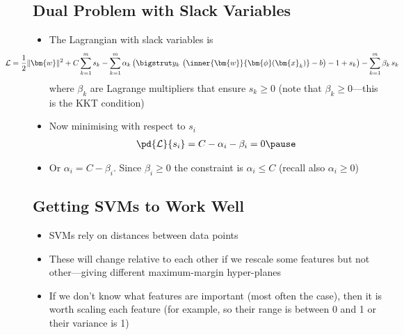 \begin{slide}
\section[-2]{Dual Problem with Slack Variables}
  
\begin{PauseHighLight}
  \begin{itemize}
  \item The Lagrangian with slack variables is { \small
    \begin{align*}
      \hspace{-2cm}\mathcal{L} = \frac{1}{2} \|\bm{w}\|^2
      + C \sum_{k=1}^m s_k
      - \sum_{k=1}^m \alpha_k \left(\bigstrut
      y_k\,\left(\strut\inner{\bm{w}}{\bm{\phi}(\bm{x}_k)} -  b\right) - 1 + s_k
      \right) - \sum_{k=1}^m \beta_k \, s_k
    \end{align*}}
    where $\beta_k$ are Lagrange multipliers that ensure $s_k\geq0$ (note
    that $\beta_k\geq0$---this is the KKT condition)\pause
  \item Now minimising with respect to $s_i$
    \begin{align*}
      \pd{\mathcal{L}}{s_i} = C - \alpha_i - \beta_i =0\pause
    \end{align*}
  \item Or $\alpha_i = C -\beta_i$.  Since $\beta_i \geq 0$ the
    constraint is $\alpha_i \leq C$\pause{} (recall also $\alpha_i\geq0$)\pauseb
  \end{itemize}
\end{PauseHighLight}

\end{slide}




\Outline %

\begin{slide}
\section[-2]{Getting SVMs to Work Well}

\pb
\begin{itemize}
\item SVMs rely on distances between data points\pauseh
\item These will change relative to each other if we rescale some
  features but not other---giving different maximum-margin
  hyper-planes\pauseh
  \begin{center}
    \pause
  \end{center}
\item If we don't know what features are important (most often the
  case), then it is worth scaling each feature (for example, so their
  range is between 0 and 1 or their variance is 1)\pause
\end{itemize}

\end{slide}


